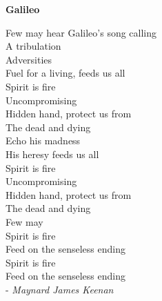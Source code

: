 

\thispagestyle{empty}
\begingroup
\let\clearpage\relax
\let\cleardoublepage\relax
\let\cleardoublepage\relax
\thispagestyle{empty}

\centering
\textbf{Galileo}
\vspace*{3em}

Few may hear Galileo’s song calling\\
A tribulation\\
Adversities\\
Fuel for a living, feeds us all\\[1em]

Spirit is fire\\
Uncompromising\\
Hidden hand, protect us from\\
The dead and dying\\[1em]

Echo his madness\\
His heresy feeds us all\\[1em]

Spirit is fire\\
Uncompromising\\
Hidden hand, protect us from\\
The dead and dying\\[1em]

Few may\\[1em]

Spirit is fire\\
Feed on the senseless ending\\[1em]

Spirit is fire\\
Feed on the senseless ending\\[3em]


- \textit{Maynard James Keenan}

\endgroup 

